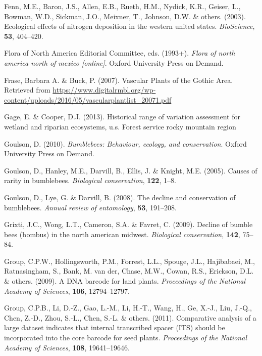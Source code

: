 \documentclass[
]{article}
\newlength{\cslhangindent}
\newlength{\cslentryspacingunit} %
\newenvironment{CSLReferences}[2] %
 {%
  \setlength{\parindent}{0pt}
  \ifodd #1
  \let\oldpar\par
  \def\par{\hangindent=\cslhangindent\oldpar}
  \fi
  \setlength{\parskip}{#2\cslentryspacingunit}
 }%
 {}
\begin{document}
\begin{CSLReferences}{1}{0}
\leavevmode{}%
Fenn, M.E., Baron, J.S., Allen, E.B., Rueth, H.M., Nydick, K.R., Geiser,
L., Bowman, W.D., Sickman, J.O., Meixner, T., Johnson, D.W. \& others.
(2003). Ecological effects of nitrogen deposition in the western united
states. \emph{BioScience}, \textbf{53}, 404--420.

\leavevmode{}%
Flora of North America Editorial Committee, eds. (1993+). \emph{Flora of
north america north of mexico {[}online{]}}. Oxford University Press on
Demand.

\leavevmode{}%
Frase, Barbara A. \& Buck, P. (2007). {Vascular Plants of the Gothic
Area}. Retrieved from
\url{https://www.digitalrmbl.org/wp-content/uploads/2016/05/vascularplantlist_20071.pdf}

\leavevmode{}%
Gage, E. \& Cooper, D.J. (2013). Historical range of variation
assessment for wetland and riparian ecosystems, u.s. Forest service
rocky mountain region

\leavevmode{}%
Goulson, D. (2010). \emph{Bumblebees: Behaviour, ecology, and
conservation}. Oxford University Press on Demand.

\leavevmode{}%
Goulson, D., Hanley, M.E., Darvill, B., Ellis, J. \& Knight, M.E.
(2005). Causes of rarity in bumblebees. \emph{Biological conservation},
\textbf{122}, 1--8.

\leavevmode{}%
Goulson, D., Lye, G. \& Darvill, B. (2008). The decline and conservation
of bumblebees. \emph{Annual review of entomology}, \textbf{53},
191--208.

\leavevmode{}%
Grixti, J.C., Wong, L.T., Cameron, S.A. \& Favret, C. (2009). Decline of
bumble bees (bombus) in the north american midwest. \emph{Biological
conservation}, \textbf{142}, 75--84.

\leavevmode{}%
Group, C.P.W., Hollingsworth, P.M., Forrest, L.L., Spouge, J.L.,
Hajibabaei, M., Ratnasingham, S., Bank, M. van der, Chase, M.W., Cowan,
R.S., Erickson, D.L. \& others. (2009). A DNA barcode for land plants.
\emph{Proceedings of the National Academy of Sciences}, \textbf{106},
12794--12797.

\leavevmode{}%
Group, C.P.B., Li, D.-Z., Gao, L.-M., Li, H.-T., Wang, H., Ge, X.-J.,
Liu, J.-Q., Chen, Z.-D., Zhou, S.-L., Chen, S.-L. \& others. (2011).
Comparative analysis of a large dataset indicates that internal
transcribed spacer (ITS) should be incorporated into the core barcode
for seed plants. \emph{Proceedings of the National Academy of Sciences},
\textbf{108}, 19641--19646.


\end{CSLReferences}
\end{document}
